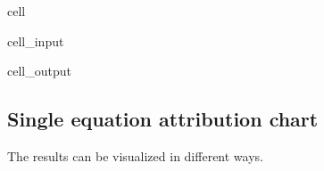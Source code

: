\documentclass[letterpaper,10pt,english]{jupyterBook}
\begin{document}
\begin{sphinxuseclass}{cell}\begin{sphinxVerbatimInput}

\begin{sphinxuseclass}{cell_input}
\begin{sphinxVerbatim}[commandchars=\\\{\}]
  
\end{sphinxVerbatim}

\end{sphinxuseclass}\end{sphinxVerbatimInput}
\begin{sphinxVerbatimOutput}

\begin{sphinxuseclass}{cell_output}
\noindent{}

\end{sphinxuseclass}\end{sphinxVerbatimOutput}

\end{sphinxuseclass}

\subsection{Single equation attribution chart}
\label{\detokenize{content/06_ModelAnalytics/AttributionSomeFeatures:single-equation-attribution-chart}}
\sphinxAtStartPar
The results can be visualized in different ways.
\end{document}
